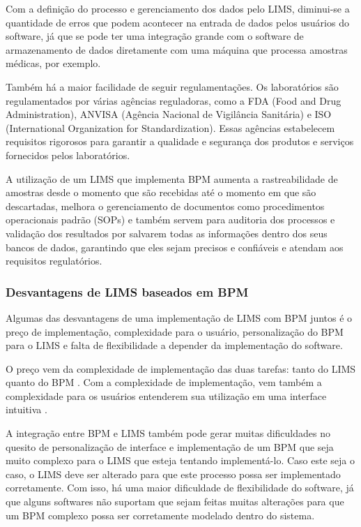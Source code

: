 Com a definição do processo e gerenciamento dos dados pelo LIMS, diminui-se a quantidade de erros que podem acontecer na entrada de dados pelos usuários do software, já que se pode ter uma integração grande com o software de armazenamento de dados diretamente com uma máquina que processa amostras médicas, por exemplo.

Também há a maior facilidade de seguir regulamentações. Os laboratórios são regulamentados por várias agências reguladoras, como a FDA (Food and Drug Administration), ANVISA (Agência Nacional de Vigilância Sanitária) e ISO (International Organization for Standardization). Essas agências estabelecem requisitos rigorosos para garantir a qualidade e segurança dos produtos e serviços fornecidos pelos laboratórios.

A utilização de um LIMS que implementa BPM aumenta a rastreabilidade de amostras desde o momento que são recebidas até o momento em que são descartadas, melhora o gerenciamento de documentos como procedimentos operacionais padrão (SOPs) e também servem para auditoria dos processos e validação dos resultados por salvarem todas as informações dentro dos seus bancos de dados, garantindo que eles sejam precisos e confiáveis e atendam aos requisitos regulatórios.


\subsubsection{Desvantagens de LIMS baseados em BPM}

Algumas das desvantagens de uma implementação de LIMS com BPM juntos é o preço de implementação, complexidade para o usuário, personalização do BPM para o LIMS e falta de flexibilidade a depender da implementação do software.

O preço vem da complexidade de implementação das duas tarefas: tanto do LIMS quanto do BPM \R. Com a complexidade de implementação, vem também a complexidade para os usuários entenderem sua utilização em uma interface intuitiva \R.

A integração entre BPM e LIMS também pode gerar muitas dificuldades no quesito de personalização de interface e implementação de um BPM que seja muito complexo para o LIMS que esteja tentando implementá-lo. Caso este seja o caso, o LIMS deve ser alterado para que este processo possa ser implementado corretamente. Com isso, há uma maior dificuldade de flexibilidade do software, já que alguns softwares não suportam que sejam feitas muitas alterações para que um BPM complexo possa ser corretamente modelado dentro do sistema.